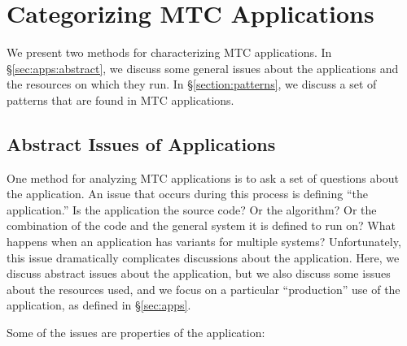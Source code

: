 \documentclass[10pt,letterpaper]{article}
\begin{document}
\section{Categorizing MTC Applications\label{sec:categories}}

We present two methods for characterizing MTC applications.
In \S\ref{sec:apps:abstract}, we
discuss some general issues about the applications and the resources on which they run.
In \S\ref{section:patterns}, we discuss a set of patterns that are found in MTC applications.

\subsection{Abstract Issues of Applications\label{sec:apps:abstract}}

One method for analyzing MTC applications is to ask a set of questions about the application.
An issue that occurs during this process is defining ``the application.''  Is the application
the source code?  Or the algorithm?  Or the combination of the code and the general
system it is defined to run on?  What happens when an application has variants for
multiple systems?  Unfortunately, this issue dramatically complicates discussions
about the application.  Here, we discuss abstract issues about the application,
but we also discuss some issues about the resources used, and we focus
on a particular ``production'' use of the application, as defined in \S\ref{sec:apps}.

Some of the issues are properties of the application:
\end{document}

